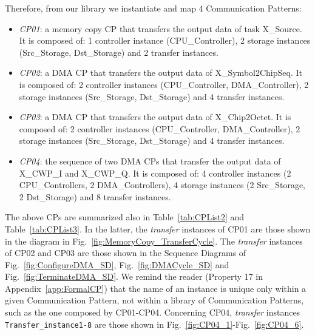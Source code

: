 \documentclass{llncs}
\begin{document}
%
Therefore, from our library we instantiate and map 4 Communication Patterns:
%
\begin{itemize}
	\item \textit{CP01}: a memory copy CP that transfers the output data of task X\_Source. It is composed of: 1
	controller instance (CPU\_Controller), 2 storage instances (Src\_Storage, Dst\_Storage) and 2 transfer
	instances.
	\item \textit{CP02}: a DMA CP that transfers the output data of X\_Symbol2ChipSeq. It is composed of: 2
	controller instances (CPU\_Controller, DMA\_Controller), 2 storage instances (Src\_Storage, Dst\_Storage) and 4
	transfer instances.
	\item \textit{CP03}: a DMA CP that transfers the output data of X\_Chip2Octet. It is composed of: 2 controller
	instances (CPU\_Controller, DMA\_Controller), 2 storage instances (Src\_Storage, Dst\_Storage) and 4 transfer
	instances.
	\item \textit{CP04}: the sequence of two DMA CPs that transfer the output data of X\_CWP\_I and X\_CWP\_Q. It is
	composed of: 4 controller instances (2 CPU\_Controllers, 2 DMA\_Controllers), 4 storage instances (2
	Src\_Storage, 2 Dst\_Storage) and 8 transfer instances.
\end{itemize}
%
The above CPs are summarized also in Table~\ref{tab:CPList2} and Table~\ref{tab:CPList3}. In the latter, the
\textit{transfer} instances of CP01 are those shown in the diagram in Fig.~\ref{fig:MemoryCopy_TransferCycle}. The
\textit{transfer} instances of CP02 and CP03 are those shown in the Sequence Diagrams of Fig.~\ref{fig:ConfigureDMA_SD},
Fig.~\ref{fig:DMACycle_SD} and Fig.~\ref{fig:TerminateDMA_SD}. We remind the reader (Property 17 in
Appendix~\ref{app:FormalCP}) that the name of an instance is unique only within a given Communication Pattern, not
within a library of Communication Patterns, such as the one composed by CP01-CP04. Concerning CP04, \textit{transfer}
instances \texttt{Transfer\_instance1-8} are those shown in Fig.~\ref{fig:CP04_1}-Fig.~\ref{fig:CP04_6}.
%
\end{document}
